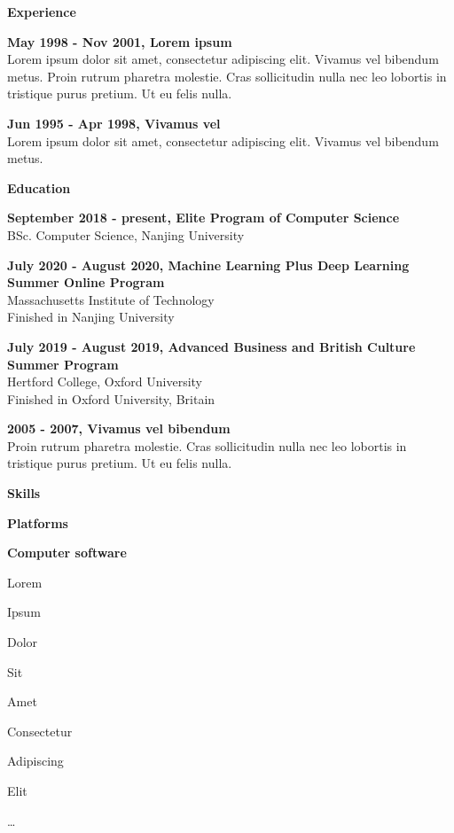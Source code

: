 \documentclass[a4paper,12pt,final]{memoir}
\newcommand{\Sep}{\vspace{1.5em}}
\newcommand{\SmallSep}{\vspace{0.5em}}
\newcommand{\CVSection}[1]
	{\Large\textbf{#1}\par
	\SmallSep\normalsize\normalfont}
\newcommand{\CVItem}[1]
	{\textbf{\color{RoyalBlue} #1}}
\begin{document}
\CVSection{Experience}
\CVItem{May 1998 - Nov 2001, Lorem ipsum}\\
Lorem ipsum dolor sit amet, consectetur adipiscing elit. Vivamus vel bibendum metus. Proin rutrum pharetra molestie. Cras sollicitudin nulla nec leo lobortis in tristique purus pretium. Ut eu felis nulla.
\SmallSep

\CVItem{Jun 1995 - Apr 1998, Vivamus vel}\\
Lorem ipsum dolor sit amet, consectetur adipiscing elit. Vivamus vel bibendum metus.

\Sep

\CVSection{Education}
\CVItem{September 2018 - present, Elite Program of Computer Science}\\
BSc. Computer Science, Nanjing University
\SmallSep

\CVItem{July 2020 - August 2020, Machine Learning Plus Deep Learning Summer Online Program}\\
Massachusetts Institute of Technology \\ 
Finished in Nanjing University
\SmallSep

\CVItem{July 2019 - August 2019, Advanced Business and British Culture Summer Program}\\
Hertford College, Oxford University\\
Finished in Oxford University, Britain
\SmallSep


\CVItem{2005 - 2007, Vivamus vel bibendum}\\
Proin rutrum pharetra molestie. Cras sollicitudin nulla nec leo lobortis in tristique purus pretium. Ut eu felis nulla.
\Sep


\CVSection{Skills}
\CVItem{Platforms}
\SmallSep

\CVItem{Computer software}
\begin{multicols}{3}
\begin{compactitem}[\color{RoyalBlue}$\circ$]
	\item Lorem 
	\item Ipsum 
	\item Dolor 
	\item Sit 
	\item Amet
	\item Consectetur 
	\item Adipiscing 
	\item Elit
	\item \ldots
\end{compactitem}
\end{multicols}
\Sep 


\end{document}
